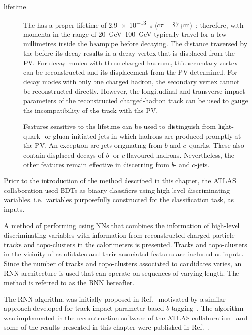 \begin{description}
\item[\tauleptonC lifetime] The \taulepton has a proper lifetime of
  \SI{2.9e-13}{\second} ($c \tau = \SI{87}{\micro\metre}$)~\cite{pdg2020};
  therefore, \tauleptons with momenta in the range of \SIrange{20}{100}{\GeV}
  typically travel for a few millimetres inside the beampipe before
  decaying. The distance traversed by the \taulepton before its decay results in
  a decay vertex that is displaced from the PV. For \tauleptonC decay modes with
  three charged hadrons, this secondary vertex can be reconstructed and its
  displacement from the PV determined. For decay modes with only one charged
  hadron, the secondary vertex cannot be reconstructed directly. However, the
  longitudinal and transverse impact parameters of the reconstructed
  charged-hadron track can be used to gauge the incompatibility of the track
  with the PV. %

  Features sensitive to the \tauleptonC lifetime can be used to distinguish
  \tauhad from light-quark- or gluon-initiated jets in which hadrons are
  produced promptly at the PV. An exception are jets originating from $b$ and
  $c$~quarks. These also contain displaced decays of $b$- or $c$-flavoured
  hadrons. Nevertheless, the other features remain effective in discerning
  \tauhad from $b$- and $c$-jets.

\end{description}
Prior to the introduction of the method described in this chapter, the
ATLAS collaboration used BDTs as binary classifiers using high-level
discriminating variables, i.e.\ variables purposefully constructed for
the classification task, as inputs.

A method of performing \tauid using NNs that combines the
information of high-level discriminating variables with information from
reconstructed charged-particle tracks and topo-clusters in the calorimeters is
presented. Tracks and topo-clusters in the vicinity of \tauhadvis candidates and
their associated features are included as inputs. Since the
number of tracks and topo-clusters associated to \tauhadvis candidates varies,
an RNN architecture is used that can operate on sequences of varying length. The
method is referred to as the RNN \tauid hereafter.

The RNN \tauid algorithm was initially proposed in Ref.~\cite{cdeutsch-master}
motivated by a similar approach developed for track impact parameter based
$b$-tagging~\cite{ATL-PHYS-PUB-2017-003}. The algorithm was implemented in the
reconstruction software of the ATLAS collaboration~\cite{ATL-SOFT-PUB-2021-001}
and some of the results presented in this chapter were published in
Ref.~\cite{ATL-PHYS-PUB-2019-033}.

